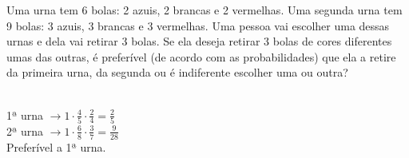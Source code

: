 \begin{ex}
  Uma urna tem 6 bolas: 2 azuis, 2 brancas e 2 vermelhas. Uma segunda urna tem 9 bolas: 3 azuis, 3 brancas e 3 vermelhas. Uma pessoa vai escolher uma dessas urnas e dela vai retirar 3 bolas. Se ela deseja retirar 3 bolas de cores diferentes umas das outras, é preferível (de acordo com as probabilidades) que ela a retire da primeira urna, da segunda ou é indiferente escolher uma ou outra?
    \begin{sol}
     \phantom{A} \\
     1ª urna $\rightarrow 1\cdot\frac{4}{5}\cdot\frac{2}{4}=\frac{2}{5}$ \\
     2ª urna $\rightarrow 1\cdot\frac{6}{8}\cdot\frac{3}{7}=\frac{9}{28}$ \\
     Preferível a 1ª urna.
     
    \end{sol}
\end{ex}